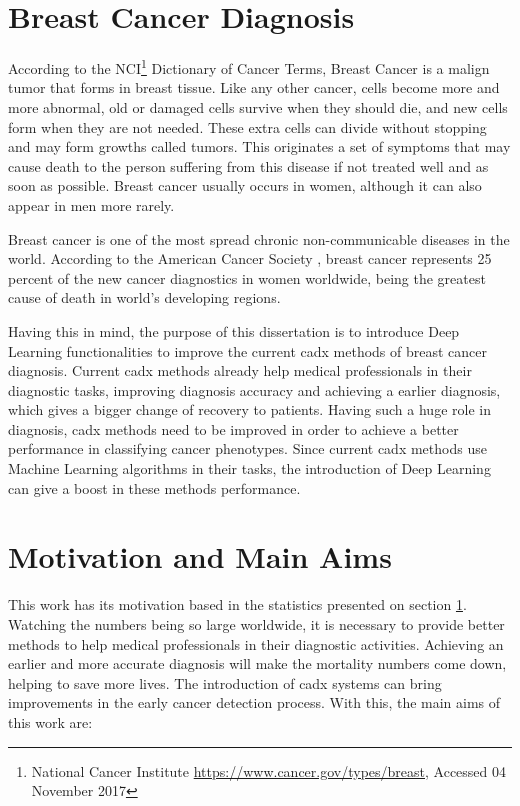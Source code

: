 \documentclass[
  twoside,
  11pt, a4paper,
  footinclude=true,
  headinclude=true,
  cleardoublepage=empty
]{scrbook}
\begin{document}
    \section{Breast Cancer Diagnosis} \label{intro:case-study}
      According to the NCI\footnote{National Cancer Institute \href{https://www.cancer.gov/types/breast}{https://www.cancer.gov/types/breast}, Accessed 04 November 2017} Dictionary of Cancer Terms, Breast Cancer is a malign tumor that forms in breast tissue. Like any other cancer, cells become more and more abnormal, old or damaged cells survive when they should die, and new cells form when they are not needed. These extra cells can divide without stopping and may form growths called tumors. This originates a set of symptoms that may cause death to the person suffering from this disease if not treated well and as soon as possible. Breast cancer usually occurs in women, although it can also appear in men more rarely.

      Breast cancer is one of the most spread chronic non-communicable diseases in the world. According to the American Cancer Society \cite{american2015global}, breast cancer represents 25 percent of the new cancer diagnostics in women worldwide, being the greatest cause of death in world's developing regions.

      Having this in mind, the purpose of this dissertation is to introduce Deep Learning functionalities to improve the current \gls{cadx} methods of breast cancer diagnosis. Current \gls{cadx} methods already help medical professionals in their diagnostic tasks, improving diagnosis accuracy and achieving a earlier diagnosis, which gives a bigger change of recovery to patients. Having such a huge role in diagnosis, \gls{cadx} methods need to be improved in order to achieve a better performance in classifying cancer phenotypes. Since current \gls{cadx} methods use Machine Learning algorithms in their tasks, the introduction of Deep Learning can give a boost in these methods performance.

    \section{Motivation and Main Aims} \label{intro:objectives}
      This work has its motivation based in the statistics presented on section \ref{intro:case-study}. Watching the numbers being so large worldwide, it is necessary to provide better methods to help medical professionals in their diagnostic activities. Achieving an earlier and more accurate diagnosis will make the mortality numbers come down, helping to save more lives. The introduction of \gls{cadx} systems can bring improvements in the early cancer detection process. With this, the main aims of this work are:
\end{document}
